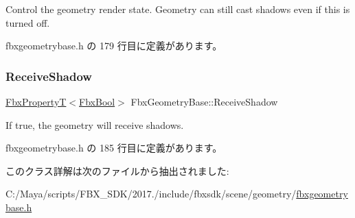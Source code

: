 Control the geometry render state. Geometry can still cast shadows even if this is turned off. 



 fbxgeometrybase.\+h の 179 行目に定義があります。

\mbox{\label{class_fbx_geometry_base_a38e79ed34812e8b02828ebb5690f4ce8}} 
\subsubsection{\texorpdfstring{Receive\+Shadow}{ReceiveShadow}}
{\footnotesize\ttfamily \hyperlink{class_fbx_property_t}{Fbx\+PropertyT}$<$\hyperlink{fbxtypes_8h_a92e0562b2fe33e76a242f498b362262e}{Fbx\+Bool}$>$ Fbx\+Geometry\+Base\+::\+Receive\+Shadow}



If true, the geometry will receive shadows. 



 fbxgeometrybase.\+h の 185 行目に定義があります。



このクラス詳解は次のファイルから抽出されました\+:\begin{DoxyCompactItemize}
\item 
C\+:/\+Maya/scripts/\+F\+B\+X\+\_\+\+S\+D\+K/2017./include/fbxsdk/scene/geometry/\hyperlink{fbxgeometrybase_8h}{fbxgeometrybase.\+h}\end{DoxyCompactItemize}
